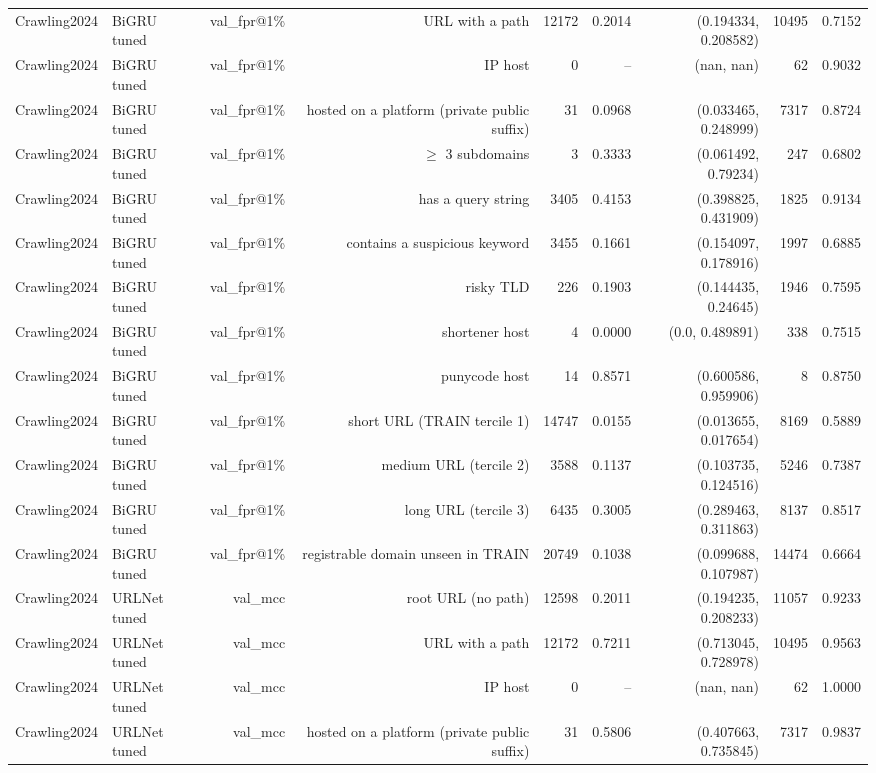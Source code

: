 \begin{table}[t]
\begin{tabular}{llrrrrrrr}
Crawling2024 & BiGRU tuned & val\_fpr@1\% & URL with a path & 12172 & 0.2014 & (0.194334, 0.208582) & 10495 & 0.7152 \\
Crawling2024 & BiGRU tuned & val\_fpr@1\% & IP host & 0 & -- & (nan, nan) & 62 & 0.9032 \\
Crawling2024 & BiGRU tuned & val\_fpr@1\% & hosted on a platform (private public suffix) & 31 & 0.0968 & (0.033465, 0.248999) & 7317 & 0.8724 \\
Crawling2024 & BiGRU tuned & val\_fpr@1\% & $\geq$ 3 subdomains & 3 & 0.3333 & (0.061492, 0.79234) & 247 & 0.6802 \\
Crawling2024 & BiGRU tuned & val\_fpr@1\% & has a query string & 3405 & 0.4153 & (0.398825, 0.431909) & 1825 & 0.9134 \\
Crawling2024 & BiGRU tuned & val\_fpr@1\% & contains a suspicious keyword & 3455 & 0.1661 & (0.154097, 0.178916) & 1997 & 0.6885 \\
Crawling2024 & BiGRU tuned & val\_fpr@1\% & risky TLD & 226 & 0.1903 & (0.144435, 0.24645) & 1946 & 0.7595 \\
Crawling2024 & BiGRU tuned & val\_fpr@1\% & shortener host & 4 & 0.0000 & (0.0, 0.489891) & 338 & 0.7515 \\
Crawling2024 & BiGRU tuned & val\_fpr@1\% & punycode host & 14 & 0.8571 & (0.600586, 0.959906) & 8 & 0.8750 \\
Crawling2024 & BiGRU tuned & val\_fpr@1\% & short URL (TRAIN tercile 1) & 14747 & 0.0155 & (0.013655, 0.017654) & 8169 & 0.5889 \\
Crawling2024 & BiGRU tuned & val\_fpr@1\% & medium URL (tercile 2) & 3588 & 0.1137 & (0.103735, 0.124516) & 5246 & 0.7387 \\
Crawling2024 & BiGRU tuned & val\_fpr@1\% & long URL (tercile 3) & 6435 & 0.3005 & (0.289463, 0.311863) & 8137 & 0.8517 \\
Crawling2024 & BiGRU tuned & val\_fpr@1\% & registrable domain unseen in TRAIN & 20749 & 0.1038 & (0.099688, 0.107987) & 14474 & 0.6664 \\
Crawling2024 & URLNet tuned & val\_mcc & root URL (no path) & 12598 & 0.2011 & (0.194235, 0.208233) & 11057 & 0.9233 \\
Crawling2024 & URLNet tuned & val\_mcc & URL with a path & 12172 & 0.7211 & (0.713045, 0.728978) & 10495 & 0.9563 \\
Crawling2024 & URLNet tuned & val\_mcc & IP host & 0 & -- & (nan, nan) & 62 & 1.0000 \\
Crawling2024 & URLNet tuned & val\_mcc & hosted on a platform (private public suffix) & 31 & 0.5806 & (0.407663, 0.735845) & 7317 & 0.9837 \\

\end{tabular}
\end{table}
